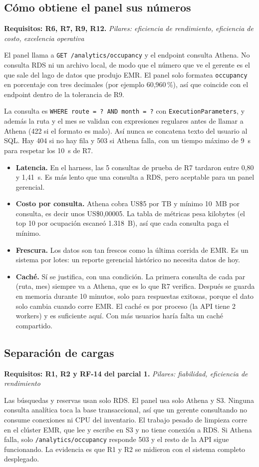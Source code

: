\documentclass[11pt,letterpaper]{article}
\newcommand{\trazo}[2]{\par\smallskip\noindent\textbf{#1.} \textit{#2}\par\smallskip}
\begin{document}
\subsection{Cómo obtiene el panel sus números}
\trazo{Requisitos: R6, R7, R9, R12}{Pilares: eficiencia de rendimiento, eficiencia de costo, excelencia operativa}
El panel llama a \texttt{GET /analytics/occupancy} y el endpoint consulta Athena. No consulta RDS ni un archivo local, de modo que el número que ve el gerente es el que sale del lago de datos que produjo EMR. El panel solo formatea \texttt{occupancy} en porcentaje con tres decimales (por ejemplo 60,960\,\%), así que coincide con el endpoint dentro de la tolerancia de R9.

La consulta es \texttt{WHERE route = ? AND month = ?} con \texttt{ExecutionParameters}, y además la ruta y el mes se validan con expresiones regulares antes de llamar a Athena (422 si el formato es malo). Así nunca se concatena texto del usuario al SQL. Hay 404 si no hay fila y 503 si Athena falla, con un tiempo máximo de 9~s para respetar los 10~s de R7.

\begin{itemize}
  \item \textbf{Latencia.} En el harness, las 5 consultas de prueba de R7 tardaron entre 0,80 y 1,41~s. Es más lento que una consulta a RDS, pero aceptable para un panel gerencial.
  \item \textbf{Costo por consulta.} Athena cobra US\$5 por TB y mínimo 10~MB por consulta, es decir unos US\$0,00005. La tabla de métricas pesa kilobytes (el top 10 por ocupación escaneó 1.318~B), así que cada consulta paga el mínimo.
  \item \textbf{Frescura.} Los datos son tan frescos como la última corrida de EMR. Es un sistema por lotes: un reporte gerencial histórico no necesita datos de hoy.
  \item \textbf{Caché.} Sí se justifica, con una condición. La primera consulta de cada par (ruta, mes) siempre va a Athena, que es lo que R7 verifica. Después se guarda en memoria durante 10 minutos, solo para respuestas exitosas, porque el dato solo cambia cuando corre EMR. El caché es por proceso (la API tiene 2 workers) y es suficiente aquí. Con más usuarios haría falta un caché compartido.
\end{itemize}

\subsection{Separación de cargas}
\trazo{Requisitos: R1, R2 y RF-14 del parcial 1}{Pilares: fiabilidad, eficiencia de rendimiento}
Las búsquedas y reservas usan solo RDS. El panel usa solo Athena y S3. Ninguna consulta analítica toca la base transaccional, así que un gerente consultando no consume conexiones ni CPU del inventario. El trabajo pesado de limpieza corre en el clúster EMR, que lee y escribe en S3 y no tiene conexión a RDS. Si Athena falla, solo \texttt{/analytics/occupancy} responde 503 y el resto de la API sigue funcionando. La evidencia es que R1 y R2 se midieron con el sistema completo desplegado.
\end{document}
